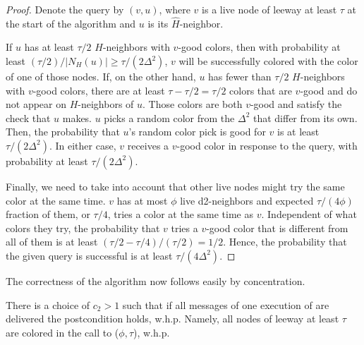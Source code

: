 \begin{proof}
Denote the query by $(v,u)$, where $v$ is a live node of leeway at least $\tau$ at the start of the algorithm and $u$ is its $\hat{H}$-neighbor.

If $u$ has at least $\tau/2$ $H$-neighbors with $v$-good colors, then with probability at least $(\tau/2)/|N_H(u)| \ge \tau / (2\Delta^2)$, $v$ will be successfully colored with the color of one of those nodes.
If, on the other hand, $u$ has fewer than $\tau/2$ $H$-neighbors with $v$-good colors, there are at least $\tau - \tau/2 = \tau/2$ colors that are $v$-good and do not appear on $H$-neighbors of $u$. Those colors are both $v$-good and 
satisfy the check that $u$ makes. 
$u$ picks a random color from the $\Delta^2$ that differ from its own.
Then, the probability that $u$'s random color pick is good for $v$ is at least $\tau/(2\Delta^2)$.
In either case, $v$ receives a $v$-good color in response to the query, with probability at least $\tau/(2\Delta^2)$.

Finally, we need to take into account that other live nodes might try the same color at the same time.
$v$ has at most $\phi$ live d2-neighbors and expected $\tau/(4\phi)$ fraction of them, or $\tau/4$, tries a color at the same time as $v$.
Independent of what colors they try, the probability that $v$ tries a $v$-good color that is different from all of them is at least $(\tau/2 - \tau/4)/(\tau/2) = 1/2$. 
%
Hence, the probability that the given query is successful is at least $\tau/(4\Delta^2)$.
\end{proof}
\fi

The correctness of the algorithm now follows easily by concentration.
\begin{theorem}
There is a choice of $c_2>1$ such that if all messages of one execution of  are delivered the postcondition holds, w.h.p. Namely, all nodes of leeway at least $\tau$ are colored in the call to ($\phi,\tau$), w.h.p.
\end{theorem}

